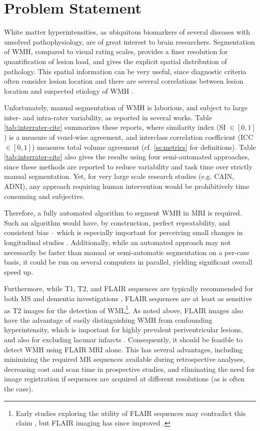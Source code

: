 \section{Problem Statement}
White matter hyperintensities, as ubiquitous biomarkers of several diseases with unsolved pathophysiology, are of great interest to brain researchers. Segmentation of WMH, compared to visual rating scales, provides a finer resolution for quantification of lesion load, and gives the explicit spatial distribution of pathology. This spatial information can be very useful, since diagnostic criteria often consider lesion location \cite{Sorbi2012} and there are several correlations between lesion location and suspected etiology of WMH \cite{Kim2008,Wardlaw2015}.
\par
Unfortunately, manual segmentation of WMH is laborious, and subject to large inter- and intra-rater variability, as reported in several works. Table \ref{tab:interrater-cite} summarizes these reports, where similarity index (SI $\in [0,1]$) is a measure of voxel-wise agreement, and interclass correlation coefficient (ICC $\in [0,1]$) measures total volume agreement (cf. \ref{ss:metrics} for definitions). Table \ref{tab:interrater-cite} also gives the results using four semi-automated approaches, since these methods are reported to reduce variability and task time over strictly manual segmentation. Yet, for very large scale research studies (e.g. CAIN, ADNI), any approach requiring human intervention would be prohibitively time consuming and subjective. 
\par 
Therefore, a fully automated algorithm to segment WMH in MRI is required. Such an algorithm would have, by construction, perfect repeatability, and consistent bias -- which is especially important for perceiving small changes in longitudinal studies \cite{MSISBI2015}. Additionally, while an automated approach may not necessarily be faster than manual or semi-automatic segmentation on a per-case basis, it could be run on several computers in parallel, yielding significant overall speed up.
\par
Furthermore, while T1, T2, and FLAIR sequences are typically recommended for both MS and dementia investigations \cite{Simon2006,Wardlaw2013,Traboulsee2015}, FLAIR sequences are at least as sensitive as T2 images for the detection of WML\footnote{Early studies exploring the utility of FLAIR sequences may contradict this claim \cite{Okuda1999,Rovaris2000}, but FLAIR imaging has since improved \cite{Wardlaw2015}.}. As noted above, FLAIR images also have the advantage of easily distinguishing WMH from confounding hyperintensity, which is important for highly prevalent periventricular lesions, and also for excluding lacunar infarcts \cite{Bakshi2001,Barkhof2002}. Consequently, it should be feasible to detect WMH using FLAIR MRI alone. This has several advantages, including minimizing the required MR sequences available during retrospective analyses, decreasing cost and scan time in prospective studies, and eliminating the need for image registration if sequences are acquired at different resolutions (as is often the case).
